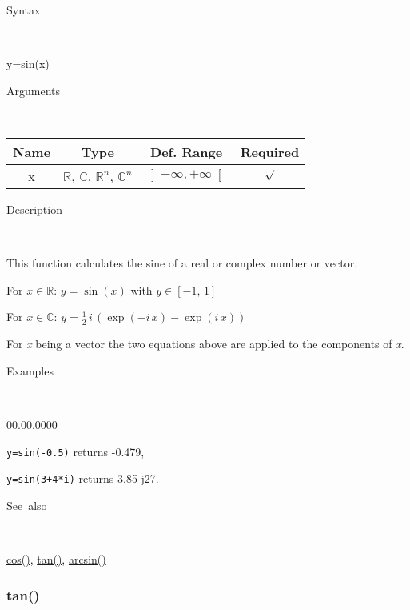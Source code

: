 \begin{description}
\item [Syntax]~
\end{description}
y=sin(x)

\begin{description}
\item [Arguments]~
\end{description}
\begin{tabular}{|c|c|c|c|}
\hline 
Name&
Type&
Def. Range&
Required\tabularnewline
\hline
\hline 
x&
$\mathbb{R}$, $\mathbb{C}$, $\mathbb{R}^{n}$, $\mathbb{C}^{n}$&
$\left]-\infty,+\infty\right[$&
$\surd$\tabularnewline
\hline
\end{tabular}

\begin{description}
\item [Description]~
\end{description}
This function calculates the sine of a real or complex number or vector.

\medskip{}
For $x\in\mathbb{R}$: $y=\sin\left(x\right)$ with $y\in\left[-1,\,1\right]$
\medskip{}

For $x\in\mathbb{C}$: $y=\frac{1}{2}\, i\,\left(\exp\left(-i\, x\right)-\exp\left(i\, x\right)\right)$
\medskip{}

For \textit{x} being a vector the two equations above are
applied to the components of \textit{x}.

\begin{description}
\item [Examples]~
\end{description}
\begin{lyxlist}{00.00.0000}
\item [\texttt{y=sin(-0.5)}]returns -0.479,
\item [\texttt{y=sin(3+4{*}i)}]returns 3.85-j27.
\end{lyxlist}
\begin{description}
\item [See~also]~
\end{description}
\textcolor{blue}{\hyperlink{cos}{cos()}}\textcolor{black}{,} \textcolor{blue}{\hyperlink{tan}{tan()}}\textcolor{black}{,}
\textcolor{blue}{\hyperlink{arcsin}{arcsin()}}


\newpage
\subsubsection*{\hypertarget{tan}{}{\Large tan()}}



